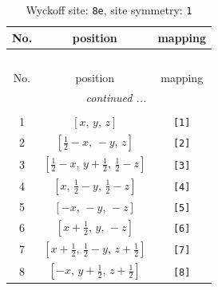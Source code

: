 \documentclass[fleqn,8pt]{jsarticle}
\begin{document}
\renewcommand{\arraystretch}{1.2}
\begin{longtable}{ccc}
\caption{Wyckoff site: {\tt 8e}, site symmetry: {\tt 1}}
 \\
 \hline \hline
No. & position & mapping \\ \hline \endfirsthead

\multicolumn{2}{l}{\tablename\ \thetable{}} \\
 \hline \hline
No. & position & mapping \\ \hline \endhead

 \hline \hline
\multicolumn{2}{r}{\footnotesize\it continued ...} \\ \endfoot

 \hline \hline
\multicolumn{2}{r}{} \\ \endlastfoot

1 & $\left[ x,\, y,\, z \right]$ & {\tt [1]} \\ \hline
2 & $\left[ \frac{1}{2} - x,\, - y,\, z \right]$ & {\tt [2]} \\ \hline
3 & $\left[ \frac{1}{2} - x,\, y + \frac{1}{2},\, \frac{1}{2} - z \right]$ & {\tt [3]} \\ \hline
4 & $\left[ x,\, \frac{1}{2} - y,\, \frac{1}{2} - z \right]$ & {\tt [4]} \\ \hline
5 & $\left[ - x,\, - y,\, - z \right]$ & {\tt [5]} \\ \hline
6 & $\left[ x + \frac{1}{2},\, y,\, - z \right]$ & {\tt [6]} \\ \hline
7 & $\left[ x + \frac{1}{2},\, \frac{1}{2} - y,\, z + \frac{1}{2} \right]$ & {\tt [7]} \\ \hline
8 & $\left[ - x,\, y + \frac{1}{2},\, z + \frac{1}{2} \right]$ & {\tt [8]} \\
\end{longtable}
\end{document}
